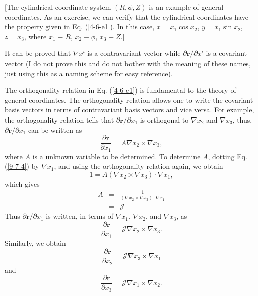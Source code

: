 \documentclass{llncs}
\begin{document}
[The cylindrical coordinate system $(R, \phi, Z)$ is an example of general
coordinates. As an exercise, we can verify that the cylindrical coordinates
have the property given in Eq. (\ref{4-6-e1}). In this case, $x = x_1 \cos
x_2$, $y = x_1 \sin x_2$, $z = x_3$, where $x_1 \equiv R$, $x_2 \equiv \phi$,
$x_3 \equiv Z$.]

It can be proved that $\nabla x^i$ is a contravariant vector while $\partial
\mathbf{r}/ \partial x^i$ is a covariant vector (I do not prove this and do
not bother with the meaning of these names, just using this as a naming scheme
for easy reference).

The orthogonality relation in Eq. (\ref{4-6-e1}) is fundamental to the theory
of general coordinates. The orthogonality relation allows one to write the
covariant basis vectors in terms of contravariant basis vectors and vice
versa. For example, the orthogonality relation tells that $\partial
\mathbf{r}/ \partial x_1$ is orthogonal to $\nabla x_2$ and $\nabla x_3$,
thus, $\partial \mathbf{r}/ \partial x_1$ can be written as
\begin{equation}
  \label{9-7-4} \frac{\partial \mathbf{r}}{\partial x_1} = A \nabla x_2 \times
  \nabla x_3,
\end{equation}
where $A$ is a unknown variable to be determined. To determine $A$, dotting
Eq. (\ref{9-7-4}) by $\nabla x_1$, and using the orthogonality relation again,
we obtain
\begin{equation}
  1 = A (\nabla x_2 \times \nabla x_3) \cdot \nabla x_1,
\end{equation}
which gives
\begin{eqnarray}
  A & = & \frac{1}{(\nabla x_2 \times \nabla x_3) \cdot \nabla x_1}
  \nonumber\\
  & = & \mathcal{J} 
\end{eqnarray}
Thus $\partial \mathbf{r}/ \partial x_1$ is written, in terms of $\nabla x_1$,
$\nabla x_2$, and $\nabla x_3$, as
\begin{equation}
  \label{9-8-1} \frac{\partial \mathbf{r}}{\partial x_1} =\mathcal{J} \nabla
  x_2 \times \nabla x_3 .
\end{equation}
Similarly, we obtain
\begin{equation}
  \label{9-8-2} \frac{\partial \mathbf{r}}{\partial x_2} =\mathcal{J} \nabla
  x_3 \times \nabla x_1
\end{equation}
and
\begin{equation}
  \label{9-8-3} \frac{\partial \mathbf{r}}{\partial x_3} =\mathcal{J} \nabla
  x_1 \times \nabla x_2 .
\end{equation}
\end{document}
